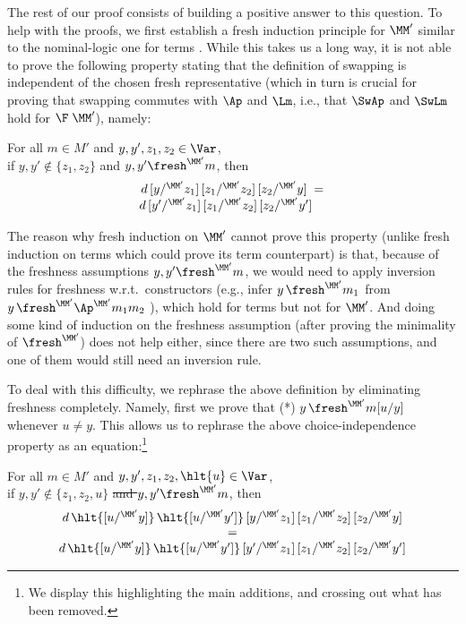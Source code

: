 		The rest of our proof consists of building a positive answer to this question. 
		To help with the proofs, we first establish a fresh induction principle for $\MM'$ similar to the nominal-logic one for terms \cite{pitts-AlphaStructural}. While this takes us a long way, it is not able to prove the following property stating that the definition of swapping is independent of the chosen fresh representative (which in turn is crucial for proving that swapping commutes with $\Ap$ and $\Lm$, i.e., that $\SwAp$ and $\SwLm$ hold for $\F\;\MM'$), namely: 
		\begin{center}
			For all $m\in M'$ and $y,y',z_1,z_2 \in \Var$,  
			\\
			if $y,y' \not\in \{z_1,z_2\}$ and $y,y' \fresh^{\MM'} m$, then 
			$$
			\begin{array}{c} 
			d\,[y /^{\MM'} z_1]\,[z_1 /^{\MM'} z_2]\,[z_2 /^{\MM'} y] \;=
			\\
			d\,[y' /^{\MM'} z_1]\,[z_1 /^{\MM'} z_2]\,[z_2 /^{\MM'} y'] \phantom{\;=}
			\end{array} 
			$$
		\end{center}  
		The reason why fresh induction on $\MM'$ cannot prove this property (unlike fresh induction on terms which could prove its term counterpart) is that, because of the freshness assumptions $y,y' \fresh^{\MM'} m$, we would need to apply inversion rules for freshness w.r.t.\ constructors (e.g., infer %
		$y \,\fresh^{\MM'} m_1$ from $y \,\fresh^{\MM'} \Ap^{\MM'}m_1m_2$ ), which hold for terms but not for $\MM'$. And doing some kind of induction on the freshness assumption (after proving the minimality of $\fresh^{\MM'}$) does not help either, since there are two such assumptions, and one of them would still need an inversion rule. 
		
		To deal with this difficulty, we rephrase the above definition by eliminating freshness completely.  Namely, first we prove that (*) $y\, \fresh^{\MM'} m[u/y]$ whenever $u \not= y$. This allows us to rephrase the above choice-independence property as an equation:\footnote{We display this highlighting the main additions, and crossing out what has been removed.}
		\begin{center} 
			For all $m\in M'$ and $y,y',z_1,z_2,\hlt{u} \in \Var$, 
			\\
			if $y,y' \not\in \{z_1,z_2,u\}$  
			\sout{and $y,y' \fresh^{\MM'} m$}, then 
			$$
			\begin{array}{c}
			d\,\hlt{[u /^{\MM'} y]}\,\hlt{[u /^{\MM'} y']}\,[y /^{\MM'} z_1]\,[z_1 /^{\MM'} z_2]\,[z_2 /^{\MM'} y] \\=\\
			d\,\hlt{[u /^{\MM'} y]}\,\hlt{[u /^{\MM'} y']}\,[y' /^{\MM'} z_1]\,[z_1 /^{\MM'} z_2]\,[z_2 /^{\MM'} y'] 
			\end{array} 
			$$
		\end{center} 
		
